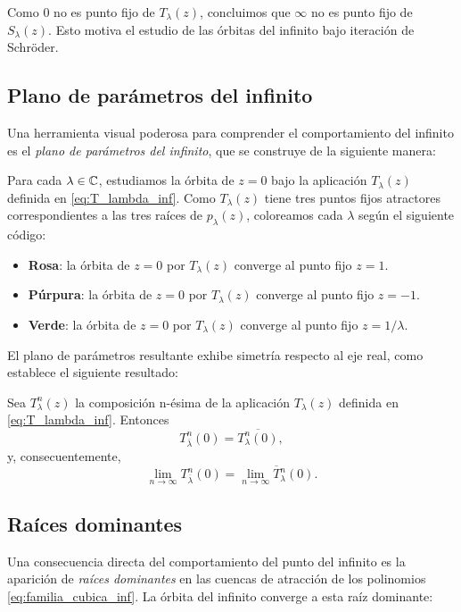 Como $0$ no es punto fijo de $T_\lambda(z)$, concluimos que $\infty$ no es punto fijo de $S_\lambda(z)$. Esto motiva el estudio de las órbitas del infinito bajo iteración de Schröder.

\subsection{Plano de parámetros del infinito}

Una herramienta visual poderosa para comprender el comportamiento del infinito es el \emph{plano de parámetros del infinito}, que se construye de la siguiente manera:

Para cada $\lambda\in\mathbb{C}$, estudiamos la órbita de $z=0$ bajo la aplicación $T_\lambda(z)$ definida en \eqref{eq:T_lambda_inf}. Como $T_\lambda(z)$ tiene tres puntos fijos atractores correspondientes a las tres raíces de $p_\lambda(z)$, coloreamos cada $\lambda$ según el siguiente código:

\begin{itemize}
\item \textbf{Rosa}: la órbita de $z=0$ por $T_\lambda(z)$ converge al punto fijo $z=1$.
\item \textbf{Púrpura}: la órbita de $z=0$ por $T_\lambda(z)$ converge al punto fijo $z=-1$.
\item \textbf{Verde}: la órbita de $z=0$ por $T_\lambda(z)$ converge al punto fijo $z=1/\lambda$.
\end{itemize}

El plano de parámetros resultante exhibe simetría respecto al eje real, como establece el siguiente resultado:

\begin{teorema}
Sea $T^n_\lambda(z)$ la composición n-ésima de la aplicación $T_\lambda(z)$ definida en \eqref{eq:T_lambda_inf}. Entonces
$$
T^n_{\overline{\lambda}}(0)=\overline{T^n_\lambda(0)},
$$
y, consecuentemente,
$$
\lim_{n\to\infty}T^n_{\overline{\lambda}}(0)=\overline{\lim_{n\to\infty}T^n_\lambda(0)}.
$$
\end{teorema}

\subsection{Raíces dominantes}

Una consecuencia directa del comportamiento del punto del infinito es la aparición de \emph{raíces dominantes} en las cuencas de atracción de los polinomios \eqref{eq:familia_cubica_inf}. La órbita del infinito converge a esta raíz dominante:

